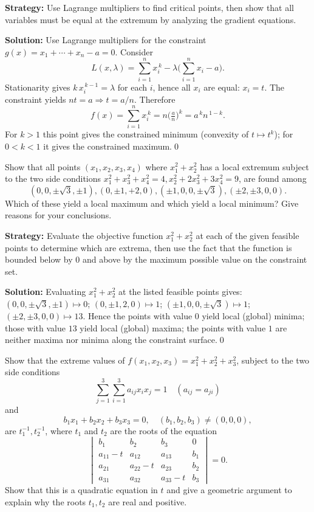 \noindent\textbf{Strategy:} Use Lagrange multipliers to find critical points, then show that all variables must be equal at the extremum by analyzing the gradient equations.

\bigskip\noindent\textbf{Solution:}
Use Lagrange multipliers for the constraint \(g(x)=x_1+\cdots+x_n-a=0\). Consider
\[L(x,\lambda)=\sum_{i=1}^n x_i^{\,k}-\lambda\Big(\sum_{i=1}^n x_i-a\Big).\]
Stationarity gives \(k\,x_i^{\,k-1}=\lambda\) for each \(i\), hence all \(x_i\) are equal: \(x_i=t\). The constraint yields \(nt=a\Rightarrow t=a/n\). Therefore
\[f(x)=\sum_{i=1}^n x_i^{\,k}=n\Big(\tfrac{a}{n}\Big)^{\!k}=a^{\,k}n^{\,1-k}.
\]
For \(k>1\) this point gives the constrained minimum (convexity of \(t\mapsto t^{k}\)); for \(0<k<1\) it gives the constrained maximum.\qed


\begin{problembox}
Show that all points \((x_1, x_2, x_3, x_4)\) where \(x_1^2 + x_2^2\) has a local extremum subject to the two side conditions \(x_1^2 + x_3^2 + x_4^2 = 4, x_2^2 + 2x_3^2 + 3x_4^2 = 9\), are found among 
\[ (0, 0, \pm \sqrt{3}, \pm 1), (0, \pm 1, +2, 0), (\pm 1, 0, 0, \pm \sqrt{3}), (\pm 2, \pm 3, 0, 0). \]
Which of these yield a local maximum and which yield a local minimum? Give reasons for your conclusions.
\end{problembox}

\noindent\textbf{Strategy:} Evaluate the objective function $x_1^2+x_2^2$ at each of the given feasible points to determine which are extrema, then use the fact that the function is bounded below by 0 and above by the maximum possible value on the constraint set.

\bigskip\noindent\textbf{Solution:}
Evaluating $x_1^2+x_2^2$ at the listed feasible points gives: $(0,0,\pm\sqrt3,\pm1)\mapsto 0$; $(0,\pm1,2,0)\mapsto 1$; $(\pm1,0,0,\pm\sqrt3)\mapsto 1$; $(\pm2,\pm3,0,0)\mapsto 13$. Hence the points with value $0$ yield local (global) minima; those with value $13$ yield local (global) maxima; the points with value $1$ are neither maxima nor minima along the constraint surface.\qed


\begin{problembox}
Show that the extreme values of \(f(x_1, x_2, x_3) = x_1^2 + x_2^2 + x_3^2\), subject to the two side conditions
\[ \sum_{j=1}^3 \sum_{i=1}^3 a_{ij} x_i x_j = 1 \quad (a_{ij} = a_{ji}) \]
and
\[ b_1 x_1 + b_2 x_2 + b_3 x_3 = 0, \quad (b_1, b_2, b_3) \neq (0, 0, 0), \]
are \(t_1^{-1}, t_2^{-1}\), where \(t_1\) and \(t_2\) are the roots of the equation
\[\begin{vmatrix}
b_1 & b_2 & b_3 & 0 \\
a_{11} - t & a_{12} & a_{13} & b_1 \\
a_{21} & a_{22} - t & a_{23} & b_2 \\
a_{31} & a_{32} & a_{33} - t & b_3
\end{vmatrix} = 0.\]
Show that this is a quadratic equation in \(t\) and give a geometric argument to explain why the roots \(t_1, t_2\) are real and positive.
\end{problembox}

